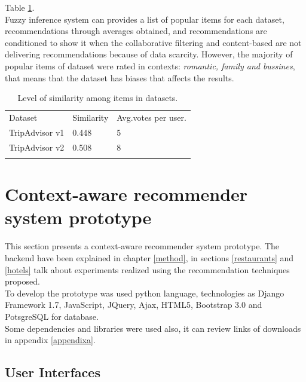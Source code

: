Table  \ref{tab:5}.\\ 
Fuzzy inference system can provides a list of popular items for each dataset,
recommendations through averages obtained, and recommendations are
conditioned to show it when the collaborative filtering and content-based 
are not delivering recommendations because of data scarcity.
However, the majority of popular items of dataset were rated in contexts: 
\textit{romantic, family and bussines}, that means that the dataset has
biases that affects the results.
\begin{table}
\centering
\small
\captionsetup{font=footnotesize}
\caption{Level of similarity among items in datasets. }
\label{tab:5}      
\begin{tabular}{lll}
\hline\noalign{\smallskip}
Dataset  & Similarity  & Avg.votes per user. \\
\noalign{\smallskip}\hline\noalign{\smallskip}
TripAdvisor v1 & 0.448  & 5  \\
TripAdvisor v2 & 0.508  & 8  \\
\noalign{\smallskip}\hline
\end{tabular}
\end{table}

\section{Context-aware recommender system prototype} 

This section presents a context-aware recommender system prototype.
The backend have been explained in chapter  \ref{method},  in sections
 \ref{restaurants} and  \ref{hotels} talk about experiments realized
using the recommendation techniques proposed. \\ To develop the prototype
was used python language, technologies as Django Framework 1.7,
JavaScript, JQuery, Ajax, HTML5, Bootstrap 3.0  and PotsgreSQL for database.\\ 
Some dependencies and libraries were used also, it can review links of
downloads in appendix  \ref{appendixa}.

\subsection{User Interfaces}

